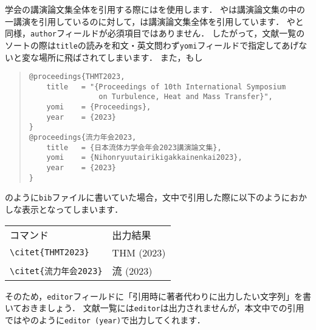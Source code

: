 \documentclass[a4paper,fleqn,uplatex,dvipdfmx]{jsarticle}
\begin{document}
学会の講演論文集全体を引用する際には\ttproceedings を使用します．
\ttconference や\ttinproceedings は講演論文集の中の一講演を引用しているのに対して，\ttproceedings は講演論文集全体を引用しています．
\ttmanual や\ttmisc と同様，\verb|author|フィールドが必須項目ではありません．
したがって，文献一覧のソートの際は\verb|title|の読みを和文・英文問わず\verb|yomi|フィールドで指定してあげないと変な場所に飛ばされてしまいます．
また，もし
\begin{quote}
\begin{verbatim}
@proceedings{THMT2023,
    title   = "{Proceedings of 10th International Symposium 
                on Turbulence, Heat and Mass Transfer}",
    yomi    = {Proceedings},
    year    = {2023}
}
@proceedings{流力年会2023,
    title   = {日本流体力学会年会2023講演論文集},
    yomi    = {Nihonryuutairikigakkainenkai2023},
    year    = {2023}
}
\end{verbatim}
\end{quote}
のように\verb|bib|ファイルに書いていた場合，文中で引用した際に以下のようにおかしな表示となってしまいます．
\begin{table}[h]
    \centering
    \begin{tabular}{ll}
        コマンド    &出力結果 \\
        \verb|\citet{THMT2023}| &THM (2023) \\
        \verb|\citet{流力年会2023}| &流 (2023) \\
    \end{tabular}
\end{table}
そのため，\verb|editor|フィールドに「引用時に著者代わりに出力したい文字列」を書いておきましょう．
文献一覧には\verb|editor|は出力されませんが，本文中での引用では\citet{THMT2023}や\citet{流力年会2023}のように\verb|editor (year)|で出力してくれます．
\end{document}
